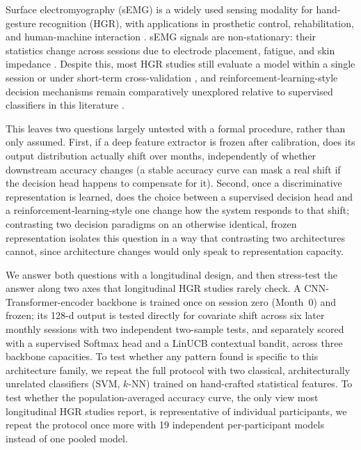 \documentclass{article}
\begin{document}
Surface electromyography (sEMG) is a widely used sensing modality for hand-gesture recognition (HGR), with applications in prosthetic control, rehabilitation, and human-machine interaction \cite{Jaramillo2020,Benalcazar2017}. sEMG signals are non-stationary: their statistics change across sessions due to electrode placement, fatigue, and skin impedance \cite{Montazerin2022,transradialSimon}. Despite this, most HGR studies still evaluate a model within a single session or under short-term cross-validation \cite{Jaramillo2020}, and reinforcement-learning-style decision mechanisms remain comparatively unexplored relative to supervised classifiers in this literature \cite{VasconezV2022,VASCONEZ2023}.

This leaves two questions largely untested with a formal procedure, rather than only assumed. First, if a deep feature extractor is frozen after calibration, does its output distribution actually shift over months, independently of whether downstream accuracy changes (a stable accuracy curve can mask a real shift if the decision head happens to compensate for it). Second, once a discriminative representation is learned, does the choice between a supervised decision head and a reinforcement-learning-style one change how the system responds to that shift; contrasting two decision paradigms on an otherwise identical, frozen representation isolates this question in a way that contrasting two architectures cannot, since architecture changes would only speak to representation capacity.

We answer both questions with a longitudinal design, and then stress-test the answer along two axes that longitudinal HGR studies rarely check. A CNN-Transformer-encoder backbone is trained once on session zero (Month~0) and frozen; its 128-d output is tested directly for covariate shift across six later monthly sessions with two independent two-sample tests, and separately scored with a supervised Softmax head and a LinUCB contextual bandit, across three backbone capacities. To test whether any pattern found is specific to this architecture family, we repeat the full protocol with two classical, architecturally unrelated classifiers (SVM, $k$-NN) trained on hand-crafted statistical features. To test whether the population-averaged accuracy curve, the only view most longitudinal HGR studies report, is representative of individual participants, we repeat the protocol once more with 19 independent per-participant models instead of one pooled model.
\end{document}
